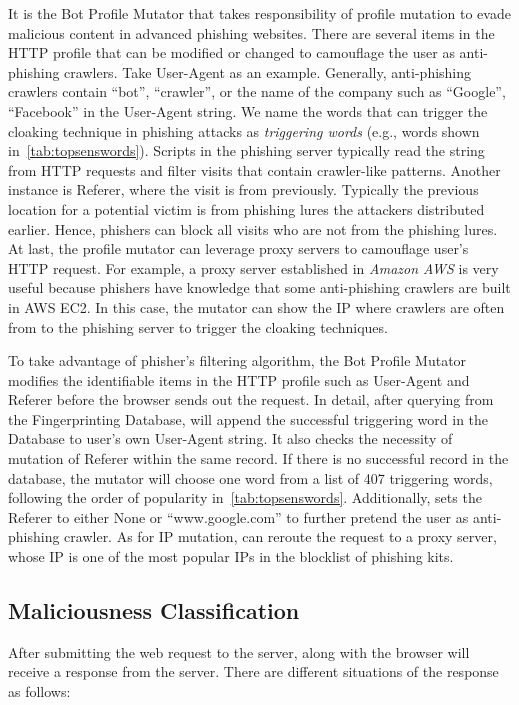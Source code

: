 It is the Bot Profile Mutator that takes responsibility of profile mutation to evade malicious content in advanced phishing websites.
There are several items in the HTTP profile that can be modified or changed to camouflage the user as anti-phishing crawlers.
Take User-Agent as an example. 
Generally, anti-phishing crawlers contain ``bot'', ``crawler'', or the name of the company such as ``Google'', ``Facebook'' in the User-Agent string.
We name the words that can trigger the cloaking technique in phishing attacks as \emph{triggering words} (e.g., words shown in~\autoref{tab:topsenswords}).
Scripts in the phishing server typically read the string from HTTP requests and filter visits that contain crawler-like patterns.
Another instance is Referer, where the visit is from previously.
Typically the previous location for a potential victim is from phishing lures the attackers distributed earlier.
Hence, phishers can block all visits who are not from the phishing lures.
At last, the profile mutator can leverage proxy servers to camouflage user's HTTP request.
For example, a proxy server established in \emph{Amazon AWS} is very useful because phishers have knowledge that some anti-phishing crawlers are built in AWS EC2.
In this case, the mutator can show the IP where crawlers are often from to the phishing server to trigger the cloaking techniques.

To take advantage of phisher's filtering algorithm, the Bot Profile Mutator modifies the identifiable items in the HTTP profile such as User-Agent and Referer before the browser sends out the request.
In detail, after querying from the Fingerprinting Database, \spartacus will append the successful triggering word in the Database to user's own User-Agent string.
It also checks the necessity of mutation of Referer within the same record.
If there is no successful record in the database,
the mutator will choose one word from a list of 407 triggering words, following the order of popularity in~\autoref{tab:topsenswords}.
Additionally, \spartacus sets the Referer to either None or ``www.google.com'' to further pretend the user as anti-phishing crawler.
As for IP mutation, \spartacus can reroute the request to a proxy server, whose IP is one of the most popular IPs in the blocklist of phishing kits.

\subsection{Maliciousness Classification}
After submitting the web request to the server, \spartacus along with the browser will receive a response from the server.
There are different situations of the response as follows:

